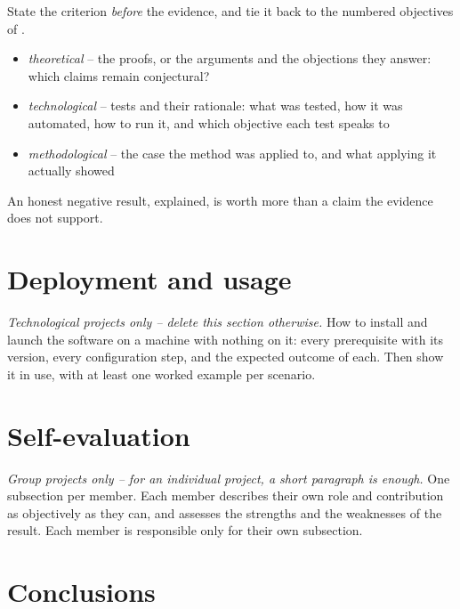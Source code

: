 \documentclass[11pt,a4paper]{scrartcl}
\begin{document}
\begin{guidance}
State the criterion \emph{before} the evidence, and tie it back to the numbered objectives of .
%
\begin{itemize}
  \item \emph{theoretical} – the proofs, or the arguments and the objections they answer: which claims remain conjectural?
  \item \emph{technological} – tests and their rationale: what was tested, how it was automated, how to run it, and which objective each test speaks to
  \item \emph{methodological} – the case the method was applied to, and what applying it actually showed
\end{itemize}

An honest negative result, explained, is worth more than a claim the evidence does not support.
\end{guidance}

\section{Deployment and usage}
\label{sec:deployment}

\begin{guidance}
\emph{Technological projects only – delete this section otherwise.}
%
How to install and launch the software on a machine with nothing on it: every prerequisite with its version, every configuration step, and the expected outcome of each. Then show it in use, with at least one worked example per scenario.
\end{guidance}

\section{Self-evaluation}
\label{sec:selfevaluation}

\begin{guidance}
\emph{Group projects only – for an individual project, a short paragraph is enough.}
%
One subsection per member. Each member describes their own role and contribution as objectively as they can, and assesses the strengths and the weaknesses of the result. Each member is responsible only for their own subsection.
\end{guidance}

\section{Conclusions}
\label{sec:conclusions}
\end{document}
